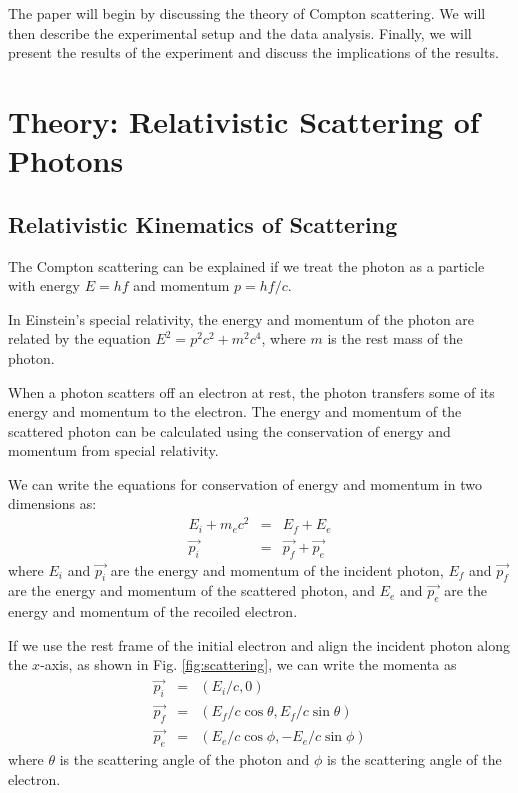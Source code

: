 The paper will begin by discussing the theory of Compton scattering. We will then describe the experimental setup and the data analysis. Finally, we will present the results of the experiment and discuss the implications of the results. 

\section{Theory: Relativistic Scattering of Photons}
\subsection{Relativistic Kinematics of Scattering}
The Compton scattering can be explained if we treat the photon as a particle with energy $E = hf$ and momentum $p = hf/c$. 

In Einstein's special relativity, the energy and momentum of the photon are related by the equation $E^2 = p^2c^2 + m^2c^4$, where $m$ is the rest mass of the photon. 

When a photon scatters off an electron at rest, the photon transfers some of its energy and momentum to the electron. The energy and momentum of the scattered photon can be calculated using the conservation of energy and momentum from special relativity. 

We can write the equations for conservation of energy and momentum in two dimensions as: 
\begin{eqnarray}
E_i + m_e c^2 &=& E_f + E_e \\
\vec{p_i} &=& \vec{p_f} + \vec{p_e}
\end{eqnarray}
where $E_i$ and $\vec{p_i}$ are the energy and momentum of the incident photon, $E_f$ and $\vec{p_f}$ are the energy and momentum of the scattered photon, and $E_e$ and $\vec{p_e}$ are the energy and momentum of the recoiled electron.

If we use the rest frame of the initial electron and align the incident photon along the $x$-axis, as shown in Fig. \ref{fig:scattering}, we can write the momenta as
\begin{eqnarray}
\vec{p_i} &=& (E_i/c, 0) \\
\vec{p_f} &=& (E_f/c\cos\theta, E_f/c \sin\theta) \\
\vec{p_e} &=& (E_e/c\cos\phi, -E_e/c \sin\phi)
\end{eqnarray}
where $\theta$ is the scattering angle of the photon and $\phi$ is the scattering angle of the electron.

